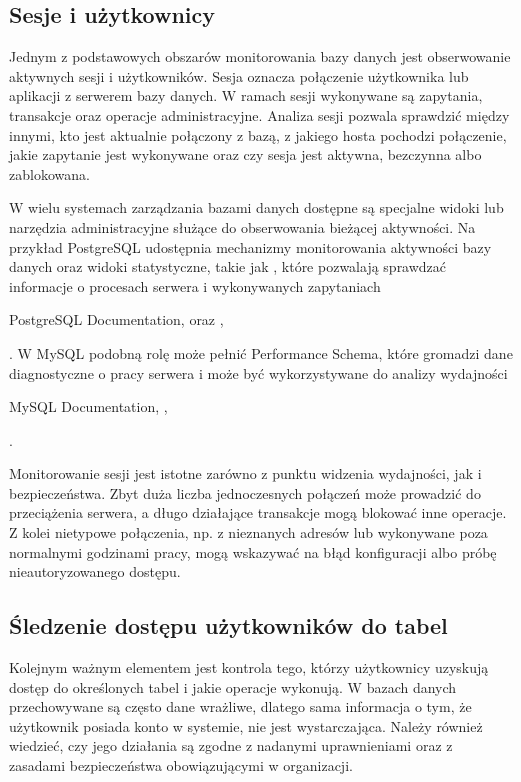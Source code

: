 \documentclass[a4paper,11pt,english,openany,oneside]{sphinxmanual}
\begin{document}
\subsection{Sesje i użytkownicy}
\label{\detokenize{rozdzial_2/rozdzial_24/index:sesje-i-uzytkownicy}}
\sphinxAtStartPar
Jednym z podstawowych obszarów monitorowania bazy danych jest obserwowanie aktywnych sesji i użytkowników. Sesja oznacza połączenie użytkownika lub aplikacji z serwerem bazy danych. W ramach sesji wykonywane są zapytania, transakcje oraz operacje administracyjne. Analiza sesji pozwala sprawdzić między innymi, kto jest aktualnie połączony z bazą, z jakiego hosta pochodzi połączenie, jakie zapytanie jest wykonywane oraz czy sesja jest aktywna, bezczynna albo zablokowana.

\sphinxAtStartPar
W wielu systemach zarządzania bazami danych dostępne są specjalne widoki lub narzędzia administracyjne służące do obserwowania bieżącej aktywności. Na przykład PostgreSQL udostępnia mechanizmy monitorowania aktywności bazy danych oraz widoki statystyczne, takie jak , które pozwalają sprawdzać informacje o procesach serwera i wykonywanych zapytaniach %
\begin{footnote}[1]\sphinxAtStartFootnote
PostgreSQL Documentation,  oraz , 
%
\end{footnote}. W MySQL podobną rolę może pełnić Performance Schema, które gromadzi dane diagnostyczne o pracy serwera i może być wykorzystywane do analizy wydajności %
\begin{footnote}[2]\sphinxAtStartFootnote
MySQL Documentation, , 
%
\end{footnote}.

\sphinxAtStartPar
Monitorowanie sesji jest istotne zarówno z punktu widzenia wydajności, jak i bezpieczeństwa. Zbyt duża liczba jednoczesnych połączeń może prowadzić do przeciążenia serwera, a długo działające transakcje mogą blokować inne operacje. Z kolei nietypowe połączenia, np. z nieznanych adresów lub wykonywane poza normalnymi godzinami pracy, mogą wskazywać na błąd konfiguracji albo próbę nieautoryzowanego dostępu.


\subsection{Śledzenie dostępu użytkowników do tabel}
\label{\detokenize{rozdzial_2/rozdzial_24/index:sledzenie-dostepu-uzytkownikow-do-tabel}}
\sphinxAtStartPar
Kolejnym ważnym elementem jest kontrola tego, którzy użytkownicy uzyskują dostęp do określonych tabel i jakie operacje wykonują. W bazach danych przechowywane są często dane wrażliwe, dlatego sama informacja o tym, że użytkownik posiada konto w systemie, nie jest wystarczająca. Należy również wiedzieć, czy jego działania są zgodne z nadanymi uprawnieniami oraz z zasadami bezpieczeństwa obowiązującymi w organizacji.
\end{document}
